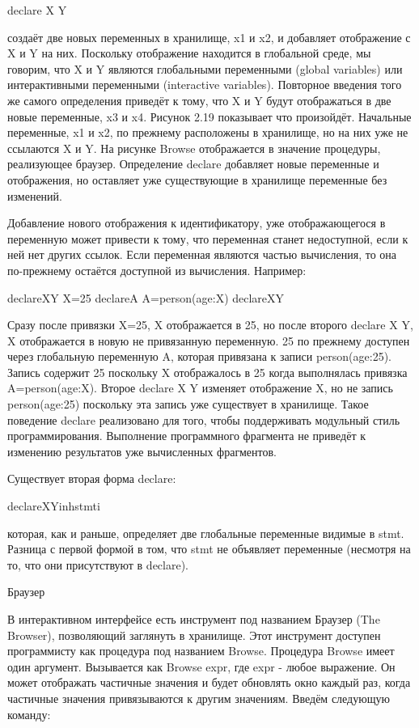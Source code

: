 declare X Y

создаёт две новых переменных в хранилище, x1 и x2, и добавляет отображение с X и Y на них. Поскольку отображение находится в глобальной среде, мы говорим, что X и Y являются глобальными переменными (global variables) или интерактивными переменными (interactive variables). Повторное введения того же самого определения приведёт к тому, что X и Y будут отображаться в две новые переменные, x3 и x4. Рисунок 2.19 показывает что произойдёт. Начальные переменные, x1 и x2, по прежнему расположены в хранилище, но на них уже не ссылаются X и Y. На рисунке Browse отображается в значение процедуры, реализующее браузер. Определение declare добавляет новые переменные и отображения, но оставляет уже существующие в хранилище переменные без изменений.

Добавление нового отображения к идентификатору, уже отображающегося в переменную может привести к тому, что переменная станет недоступной, если к ней нет других ссылок. Если переменная являются частью вычисления, то она по-прежнему остаётся доступной из вычисления. Например:

declareXY
X=25
declareA
A=person(age:X)
declareXY

Сразу после привязки X=25, X отображается в 25, но после второго declare X Y, X отображается в новую не привязанную переменную. 25 по прежнему доступен через глобальную переменную A, которая привязана к записи person(age:25). Запись содержит 25 поскольку X отображалось в 25 когда выполнялась привязка A=person(age:X). Второе declare X Y изменяет отображение X, но не запись person(age:25) поскольку эта запись уже существует в хранилище. Такое поведение declare реализовано для того, чтобы поддерживать модульный стиль программирования. Выполнение программного фрагмента не приведёт к изменению результатов уже вычисленных фрагментов.

Существует вторая форма declare:

declareXYinhstmti

которая, как и раньше, определяет две глобальные переменные видимые в stmt. Разница с первой формой в том, что stmt не объявляет переменные (несмотря на то, что они присутствуют в declare).

Браузер

В интерактивном интерфейсе есть инструмент под названием Браузер (The Browser), позволяющий заглянуть в хранилище. Этот инструмент доступен программисту как процедура под названием Browse. Процедура Browse имеет один аргумент. Вызывается как {Browse expr}, где expr - любое выражение. Он может отображать частичные значения и будет обновлять окно каждый раз, когда частичные значения привязываются к другим значениям. Введём следующую команду:

